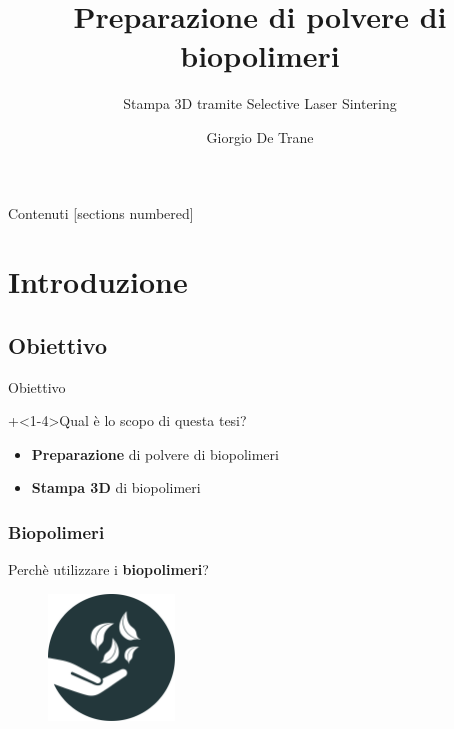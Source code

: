 \documentclass[15pt, aspectratio=169]{beamer}
\title{Preparazione di polvere di biopolimeri}
\subtitle{Stampa 3D tramite Selective Laser Sintering}
\date{}
\author{Giorgio De Trane}
\institute{Politecnico di Torino}
\begin{document}
\maketitle

\begin{frame}{Contenuti}
  [sections numbered]
  \tableofcontents[hideallsubsections]
\end{frame}


\section{Introduzione}
  \subsection{Obiettivo}

  \begin{frame}{Obiettivo}

    \onslide+<1-4>{Qual è lo scopo di questa tesi?}

    
    \begin{itemize}
      \item <2->\textbf{Preparazione} di polvere di biopolimeri
      \item <3->\textbf{Stampa 3D} di biopolimeri
    \end{itemize}

  \end{frame}

  \begin{frame}
    \frametitle{Biopolimeri}
    \begin{center}
        Perchè utilizzare i \textbf{biopolimeri}?
    \end{center}
    \begin{figure}[h]
      \centering
      \includegraphics[width=0.3\textwidth]{Pictures/Vector/PDF/hand_bio.pdf}
      
    \end{figure}

  \end{frame}
\end{document}
